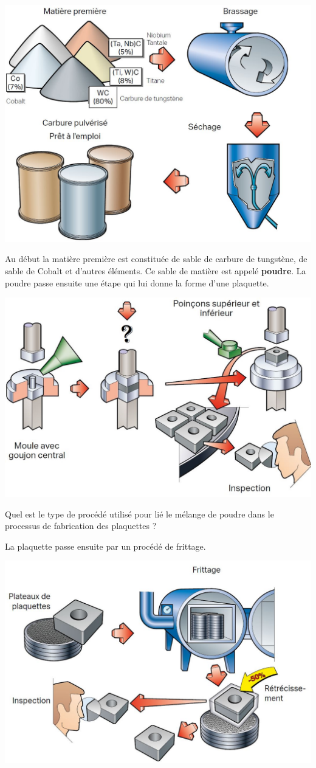\documentclass[12pt]{article}
\newcounter{exo}
\newenvironment{exo}{\stepcounter{exo}\vspace{0.5cm}{\bfseries Question \theexo\ :}}{\par\vspace{0.5cm}}
\begin{document}
\begin{center}
\includegraphics[width=0.7\linewidth]{Images/PLA11.JPG}
\end{center}

Au début la matière première est constituée de sable de carbure de tungstène, de sable de Cobalt et d'autres éléments. Ce sable de matière est appelé \textbf{poudre}. La poudre passe ensuite une étape qui lui donne la forme d'une plaquette.



\begin{center}
\includegraphics[width=0.7\linewidth]{Images/PLA12.JPG}
\end{center}

\begin{exo} Quel est le type de procédé utilisé pour lié le mélange de poudre dans le processus de fabrication des plaquettes ?\end{exo}

\noindent
La plaquette passe ensuite par un procédé de frittage.


\begin{center}
\includegraphics[width=0.7\linewidth]{Images/PLA13.JPG}
\end{center}
\end{document}
